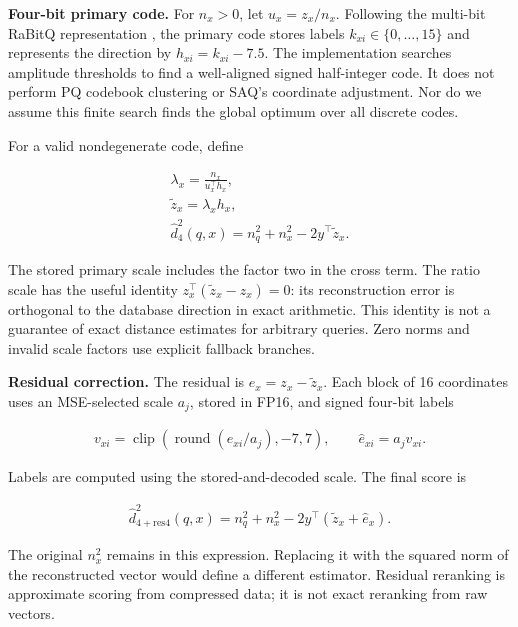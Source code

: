\textbf{Four-bit primary code.} For $n_x>0$, let $u_x=z_x/n_x$. Following the multi-bit RaBitQ representation \cite{exrabitq}, the primary code stores labels $k_{xi}\in\{0,\ldots,15\}$ and represents the direction by $h_{xi}=k_{xi}-7.5$. The implementation searches amplitude thresholds to find a well-aligned signed half-integer code. It does not perform PQ codebook clustering or SAQ's coordinate adjustment. Nor do we assume this finite search finds the global optimum over all discrete codes.

For a valid nondegenerate code, define

\begin{equation}
\begin{gathered}
\lambda_x=\frac{n_x}{u_x^\top h_x},\\
\widetilde z_x=\lambda_xh_x,\\
\widehat d_4^2(q,x)=n_q^2+n_x^2-2y^\top\widetilde z_x.
\end{gathered}
\end{equation}

The stored primary scale includes the factor two in the cross term. The ratio scale has the useful identity $z_x^\top(\widetilde z_x-z_x)=0$: its reconstruction error is orthogonal to the database direction in exact arithmetic. This identity is not a guarantee of exact distance estimates for arbitrary queries. Zero norms and invalid scale factors use explicit fallback branches.

\textbf{Residual correction.} The residual is $e_x=z_x-\widetilde z_x$. Each block of 16 coordinates uses an MSE-selected scale $a_j$, stored in FP16, and signed four-bit labels

\begin{equation}
\begin{gathered}
v_{xi}=\operatorname{clip}(\operatorname{round}(e_{xi}/a_j),-7,7),
\qquad \widehat e_{xi}=a_jv_{xi}.
\end{gathered}
\end{equation}

Labels are computed using the stored-and-decoded scale. The final score is

\begin{equation}
\begin{gathered}
\widehat d_{4+\mathrm{res4}}^2(q,x)=n_q^2+n_x^2-2y^\top(\widetilde z_x+\widehat e_x).
\end{gathered}
\end{equation}

The original $n_x^2$ remains in this expression. Replacing it with the squared norm of the reconstructed vector would define a different estimator. Residual reranking is approximate scoring from compressed data; it is not exact reranking from raw vectors.

